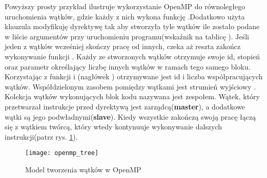 \documentclass[document.tex]{subfiles}
\begin{document}
Powyższy prosty przykład ilustruje wykorzystanie OpenMP do równoległego
uruchomienia  wątków, gdzie każdy z nich wykona
funkcję .Dodatkowo użyta klauzula 
modyfikuję dyrektywę tak aby stworzyła tyle wątków ile zostało 
podane w liście argumentów przy uruchomieniu programu(wskaźnik na tablicę ). Jeśli jeden z wątków wcześniej skończy pracę od innych,
czeka aż reszta zakończ wykonywanie funkcji .
Każdy ze stworzonych wątków otrzymuje swoje id, stopień oraz parametr
określający liczbę innych wątków w ramach tego samego bloku.
Korzystając z funkcji  i 
(nagłówek ) otrzymywane jest id i liczba współpracujących wątków.
Współdzielonym zasobem pomiędzy wątkami jest strumień wyjściowy .
\cite{openmp_pacheco}\cite{openmp_slides}
\\
\indent Kolekcja wątków wykonujących blok kodu nazywana jest zespołem. Wątek,
który przetwarzał instrukcje przed dyrektywą  
jest zarządcą(\textbf{master}), a dodatkowe wątki są jego podwładnymi(\textbf{slave}). Kiedy wszystkie zakończą swoją pracę łączą się z
wątkiem twórcą, który wtedy kontynuuje wykonywanie dalszych instrukcji(patrz rys. \ref{fig:openmp_tree}).\cite{openmp_blaise}\cite{openmp_spec}

\begin{figure}[h]
\texttt{[image: openmp\_tree]}
\caption{Model tworzenia wątków w OpenMP\protect\cite{openmp_blaise}}
\label{fig:openmp_tree}
\end{figure}
\end{document}
